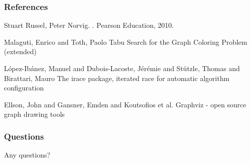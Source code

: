 \documentclass{beamer}
\begin{document}



\begin{frame}
  \frametitle<presentation>{References}    
  \begin{thebibliography}{3}

    \beamertemplatebookbibitems
    Stuart Russel, Peter Norvig.
    .
    \newblock Pearson Education, 2010.

    
  \beamertemplatearticlebibitems
    Malaguti, Enrico and Toth, Paolo
    \newblock Tabu Search for the Graph Coloring Problem (extended)


    L{\'o}pez-Ib{\'a}nez, Manuel and Dubois-Lacoste, J{\'e}r{\'e}mie and St{\"u}tzle, Thomas and Birattari, Mauro
    \newblock The irace package, iterated race for automatic algorithm configuration


Ellson, John and Gansner, Emden and Koutsofios et al.
    \newblock Graphviz - open source graph drawing tools
    
  \end{thebibliography}
\end{frame}

\begin{frame}
\frametitle{Questions}
\centerline{Any questions?}
\end{frame}
\end{document}
